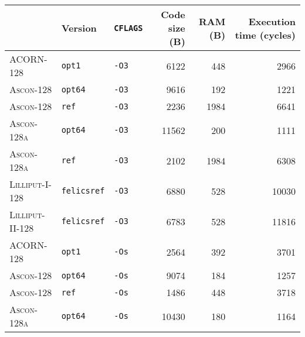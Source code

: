 \begin{table}[H]
  \centering
  \begin{tabular}{l|l|l||r|r|r}
      \textbf{}                & \textbf{Version}   & \textbf{\texttt{CFLAGS}} & \textbf{Code size (B)} & \textbf{RAM (B)} & \textbf{Execution time (cycles)} \\ \hline
      \textsc{ACORN-128}       & \texttt{opt1}      & \texttt{-O3}             &                   6122 &              448 &                             2966 \\ \hline
      \textsc{Ascon-128}       & \texttt{opt64}     & \texttt{-O3}             &                   9616 &              192 &                             1221 \\ \hline
      \textsc{Ascon-128}       & \texttt{ref}       & \texttt{-O3}             &                   2236 &             1984 &                             6641 \\ \hline
      \textsc{Ascon-128a}      & \texttt{opt64}     & \texttt{-O3}             &                  11562 &              200 &                             1111 \\ \hline
      \textsc{Ascon-128a}      & \texttt{ref}       & \texttt{-O3}             &                   2102 &             1984 &                             6308 \\ \hline
      \textsc{Lilliput-I-128}  & \texttt{felicsref} & \texttt{-O3}             &                   6880 &              528 &                            10030 \\ \hline
      \textsc{Lilliput-II-128} & \texttt{felicsref} & \texttt{-O3}             &                   6783 &              528 &                            11816 \\ \hline
      \textsc{ACORN-128}       & \texttt{opt1}      & \texttt{-Os}             &                   2564 &              392 &                             3701 \\ \hline
      \textsc{Ascon-128}       & \texttt{opt64}     & \texttt{-Os}             &                   9074 &              184 &                             1257 \\ \hline
      \textsc{Ascon-128}       & \texttt{ref}       & \texttt{-Os}             &                   1486 &              448 &                             3718 \\ \hline
      \textsc{Ascon-128a}      & \texttt{opt64}     & \texttt{-Os}             &                  10430 &              180 &                             1164 \\ \hline

\end{tabular}
\end{table}
